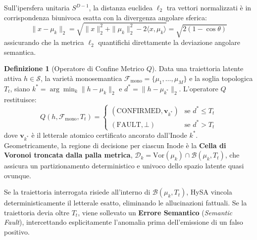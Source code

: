\documentclass[11pt,a4paper]{article}
\theoremstyle{definition}
\newtheorem{definizione}{Definizione}
\begin{document}
Sull'ipersfera unitaria $S^{D-1}$, la distanza euclidea $\ell_2$ tra vettori normalizzati è in corrispondenza biunivoca esatta con la divergenza angolare sferica:
\begin{equation}
    \|x - \mu_k\|_2 = \sqrt{\|x\|_2^2 + \|\mu_k\|_2^2 - 2 \langle x, \mu_k \rangle} = \sqrt{2(1 - \cos\theta)}
\end{equation}
assicurando che la metrica $\ell_2$ quantifichi direttamente la deviazione angolare semantica.

\begin{definizione}[Operatore di Confine Metrico $Q$]
Data una traiettoria latente attiva $h \in \mathcal{S}$, la varietà monosemantica $\mathcal{F}_{\mathrm{mono}} = \{\mu_1, \dots, \mu_M\}$ e la soglia topologica $T_t$, siano $k^* = \arg\min_k \|h - \mu_k\|_2$ e $d^* = \|h - \mu_{k^*}\|_2$. L'operatore $Q$ restituisce:
\begin{equation}
    Q(h, \mathcal{F}_{\mathrm{mono}}, T_t) = 
    \begin{cases} 
      (\mathrm{CONFIRMED}, \mathbf{v}_{k^*}) & \text{se } d^* \le T_t \\ 
      (\mathrm{FAULT}, \bot) & \text{se } d^* > T_t 
    \end{cases}
    \label{eq:query_operator}
\end{equation}
dove $\mathbf{v}_{k^*}$ è il letterale atomico certificato ancorato dall'Inode $k^*$. Geometricamente, la regione di decisione per ciascun Inode è la \textbf{Cella di Voronoi troncata dalla palla metrica}, $\mathcal{D}_k = \mathrm{Vor}(\mu_k) \cap \mathcal{B}(\mu_k, T_t)$, che assicura un partizionamento deterministico e univoco dello spazio latente quasi ovunque.
\end{definizione}

Se la traiettoria interrogata risiede all'interno di $\mathcal{B}(\mu_k, T_t)$, HySA vincola deterministicamente il letterale esatto, eliminando le allucinazioni fattuali. Se la traiettoria devia oltre $T_t$, viene sollevato un \textbf{Errore Semantico} (\textit{Semantic Fault}), intercettando esplicitamente l'anomalia prima dell'emissione di un falso positivo.
\end{document}
